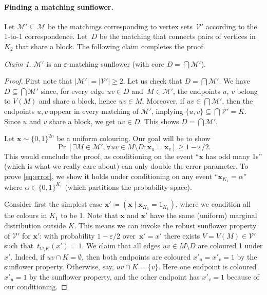 \documentclass[11pt]{article}
\theoremstyle{plain}
\theoremstyle{definition}
\theoremstyle{remark}
\newtheorem{claim}{Claim}
\newcommand{\eps}{\varepsilon}
\def\calm{{\mathcal M}}
\def\calv{{\mathcal V}}
\begin{document}
\paragraph{Finding a matching sunflower.}
Let $\calm'\subseteq\calm$ be the matchings corresponding to vertex sets~$\calv'$ according to the 1-to-1 correspondence. Let~$D$ be the matching that connects pairs of vertices in~$K_2$ that share a block. The following claim completes the proof.

\pagebreak
\begin{claim}
$\calm'$ is an $\varepsilon$-matching sunflower (with core $D=\bigcap\calm'$). 
\end{claim}
\begin{proof}
First note that $|\calm'|=|\calv'|\geq 2$. Let us check
that $D=\bigcap\calm'$. We have $D\subseteq\bigcap\calm'$ since, for every edge $uv \in D$ and~$M\in\calm'$, the endpoints $u$, $v$ belong to $V(M)$ and share a block, hence $uv \in M$. 
Moreover,
if $uv \in \bigcap \calm'$,
then the endpoints $u, v$
appear in every matching of $\calm'$,
implying
$\{u,v \} \subseteq \bigcap \calv' = K$.
Since $u$ and $v$ share a block,
we get $uv \in D$.
This shows $D = \bigcap \calm'$.

Let $\bm x \sim \{0,1\}^{2n}$ be a uniform colouring. Our goal will be to show
\begin{equation}\label{eq:error} 
    \Pr[\exists M \in \calm', \forall uv \in M \setminus D\colon \bm x_u = \bm x_v] \ge 1 - \eps/2.
\end{equation}
This would conclude the proof, as conditioning on the event ``$\bm x$ has odd many 1s'' (which is what we really care about) can only double the error parameter. To prove \eqref{eq:error}, we show it holds under conditioning on any event ``$\bm x_{K_1} = \alpha$'' where $\alpha\in\{0,1\}^{K_1}$ (which partitions the probability space).

Consider first the simplest case $\bm x'\coloneqq (\bm x\mid \bm x_{K_1}=1_{K_1})$, where we condition all the colours in $K_1$ to be 1. Note that $\bm x$ and $\bm x'$ have the same (uniform) marginal distribution outside $K$. This means we can invoke the robust sunflower property of $\calv'$ for $\bm x'$: with probability $1-\varepsilon/2$ over~$\bm x'=x'$ there exists $V=V(M) \in \calv'$ such that~$t_{V \setminus K}(x') = 1$. We claim that all edges $uv \in M \setminus D$ are coloured 1 under $x'$. Indeed, if $uv \cap K = \emptyset$, then both endpoints are coloured $x'_u=x'_v=1$ by the sunflower property. Otherwise, say, $uv\cap K=\{v\}$. Here one endpoint is coloured $x'_u=1$ by the sunflower property, and the other endpoint has $x'_v = 1$ because of our conditioning.


\end{proof}
\end{document}
